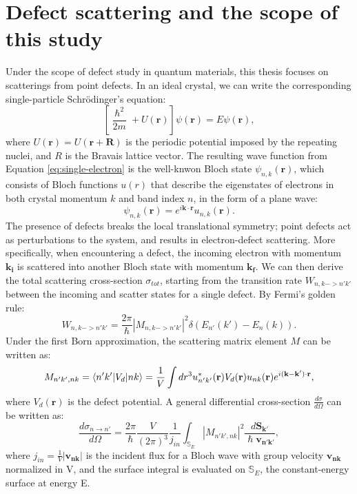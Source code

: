 \section{Defect scattering and the scope of this study}\label{sec:scopeofstudy}
Under the scope of defect study in quantum materials, this thesis focuses on scatterings from point defects. In an ideal crystal, we can write the corresponding single-particle Schr\"{o}dinger's equation: 
\begin{equation}
	\label{eq:single-electron}
	\left[\frac{\hslash^2}{2m}+U(\mathbf{r})\right]\psi(\mathbf{r}) = E\psi(\mathbf{r}),
\end{equation}
where $U(\mathbf{r})=U(\mathbf{r}+\mathbf{R})$ is the periodic potential imposed by the repeating nuclei, and $R$ is the Bravais lattice vector. 
The resulting wave function from Equation \ref{eq:single-electron} is the well-knwon Bloch state $\psi_{n,k}(\mathbf{r})$, which consists of Bloch functions $u(r)$ that describe the eigenstates of electrons in both crystal momentum $k$ and band index $n$, in the form of a plane wave: 
\begin{equation}
	\psi_{n,k}(\mathbf{r}) = e^{i\mathbf{k}\cdot \mathbf{r}}u_{n,k}(\mathbf{r}).
\end{equation}
The presence of defects breaks the local translational symmetry; point defects act as perturbations to the system, and results in electron-defect scattering. More specifically, when encountering a defect, the incoming electron with momentum $\mathbf{k_i}$ is scattered into another Bloch state with momentum $\mathbf{k_f}$. We can then derive the total scattering cross-section $\sigma_{tot}$, starting from the transition rate $W_{n,k->n'k'}$ between the incoming and scatter states for a single defect. By Fermi's golden rule:
\begin{equation}
	W_{n,k->n'k'} = \frac{2\pi}{\hslash}|M_{n,k->n'k'}|^2\delta(E_{n'}(k')-E_{n}(k)). 
\end{equation}
Under the first Born approximation, the scattering matrix element $M$ can be written as:  
\begin{equation}
	M_{n'k',nk} = \braket{n'k'|V_d|nk} = \frac{1}{V}\int dr^3 \space u_{n'k'}^{*}(\mathbf{r}) V_d(\mathbf{r}) u_{nk}(\mathbf{r})e^{i(\mathbf{k}-\mathbf{k'})\cdot \mathbf{r}},
\end{equation} 
where $V_d(\mathbf{r})$ is the defect potential. A general differential cross-section $\frac{d\sigma}{d\Omega}$ can be written as: 
\begin{equation}
	\label{eq:differential_cross_section}
	\frac{d\sigma_{n\rightarrow n'}}{d\Omega} = \frac{2\pi}{\hslash} \frac{V}{(2\pi)^3}\frac{1}{j_{in}}\int_{\mathbb{S}_E}|M_{n'k',nk}|^2\frac{d\mathbf{S_{k'}}}{\hslash \mathbf{v_{n'k'}}},
\end{equation}
where $j_{in} = \frac{1}{V}|\mathbf{v_{nk}}|$ is the incident flux for a Bloch wave with group velocity $\mathbf{v_{nk}}$ normalized in V, and the surface integral is evaluated on $\mathbb{S}_E$, the constant-energy surface at energy E. 

